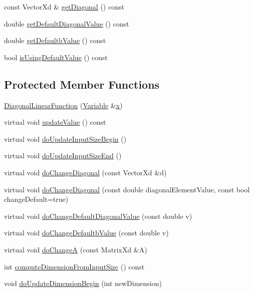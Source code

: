 {\bf }\par
\begin{DoxyCompactItemize}
\item 
const Vector\+Xd \& \hyperlink{classocra_1_1DiagonalLinearFunction_a1b2acc7225716b75ef0cf9995a49406b}{get\+Diagonal} () const
\item 
double \hyperlink{classocra_1_1DiagonalLinearFunction_a01a923080ce21e1328503c29b1b57c6e}{get\+Default\+Diagonal\+Value} () const
\item 
double \hyperlink{classocra_1_1DiagonalLinearFunction_afc676bfa2611945421d73b18e2740bd0}{get\+Defaultb\+Value} () const
\item 
bool \hyperlink{classocra_1_1DiagonalLinearFunction_a8cca25ae530e9af992acf44e3b95da2a}{is\+Using\+Default\+Value} () const
\end{DoxyCompactItemize}

\subsection*{Protected Member Functions}
\begin{DoxyCompactItemize}
\item 
\hyperlink{classocra_1_1DiagonalLinearFunction_ac2c460e4eedb9feba5a74ec967719654}{Diagonal\+Linear\+Function} (\hyperlink{classocra_1_1Variable}{Variable} \&\hyperlink{classocra_1_1Function_a28825886d1f149c87b112ec2ec1dd486}{x})
\item 
virtual void \hyperlink{classocra_1_1DiagonalLinearFunction_a69523347749429dae6ae041326e40d43}{update\+Value} () const
\item 
virtual void \hyperlink{classocra_1_1DiagonalLinearFunction_a2071e4c52785c88119917460b94773cb}{do\+Update\+Input\+Size\+Begin} ()
\item 
virtual void \hyperlink{classocra_1_1DiagonalLinearFunction_a8a51d23c302c9bad9579b95e29481f55}{do\+Update\+Input\+Size\+End} ()
\item 
virtual void \hyperlink{classocra_1_1DiagonalLinearFunction_a5355515d58348a3eea92f36e35b1c7d5}{do\+Change\+Diagonal} (const Vector\+Xd \&d)
\item 
virtual void \hyperlink{classocra_1_1DiagonalLinearFunction_a0673bfe405d5637182c4749dd2737e95}{do\+Change\+Diagonal} (const double diagonal\+Element\+Value, const bool change\+Default=true)
\item 
virtual void \hyperlink{classocra_1_1DiagonalLinearFunction_a81120f5a61cc53cc940f4e71b35174ff}{do\+Change\+Default\+Diagonal\+Value} (const double v)
\item 
virtual void \hyperlink{classocra_1_1DiagonalLinearFunction_a9995af94055dc443c10018869a393635}{do\+Change\+Defaultb\+Value} (const double v)
\item 
virtual void \hyperlink{classocra_1_1DiagonalLinearFunction_addc4f984a5a71b170137788f15e2d12c}{do\+ChangeA} (const Matrix\+Xd \&A)
\item 
int \hyperlink{classocra_1_1DiagonalLinearFunction_af41faa708f35e39c2f797f70ae7ce695}{compute\+Dimension\+From\+Input\+Size} () const
\item 
void \hyperlink{classocra_1_1DiagonalLinearFunction_a86b326e3578c8405806eab4ec6522ab2}{do\+Update\+Dimension\+Begin} (int new\+Dimension)
\end{DoxyCompactItemize}
